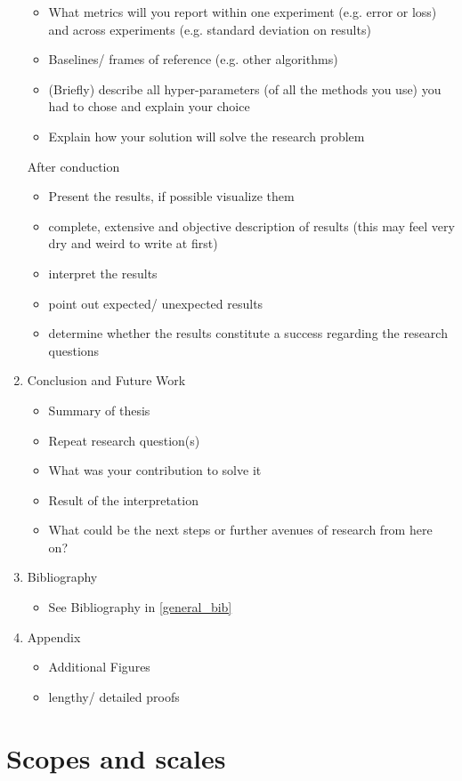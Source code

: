 \documentclass[twocolumn]{mlai-guide}
\begin{document}
\begin{enumerate}
\begin{itemize}
			\item What metrics will you report within one experiment (e.g. error or loss) and across experiments (e.g. standard deviation on results)
			\item Baselines/ frames of reference (e.g. other algorithms)
			\item (Briefly) describe all hyper-parameters (of all the methods you use) you had to chose and explain your choice
			\item Explain how your solution will solve the research problem
		\end{itemize} 
		After conduction
		\begin{itemize}
			\item Present the results, if possible visualize them
			\item complete, extensive and objective description of results (this may feel very dry and weird to write at first)
			\item interpret the results
			\item point out expected/ unexpected results
			\item determine whether the results constitute a success regarding the research questions
		\end{itemize}
	\item Conclusion and Future Work
		\begin{itemize}
			\item Summary of thesis
			\item Repeat research question(s)
			\item What was your contribution to solve it
			\item Result of the interpretation
			\item What could be the next steps or further avenues of research from here on?
		\end{itemize}
	\item Bibliography
		\begin{itemize}
			\item See Bibliography in \ref{general_bib}
		\end{itemize}
	\item Appendix
		\begin{itemize}
			\item Additional Figures
			\item lengthy/ detailed proofs
		\end{itemize}
\end{enumerate}

\section{Scopes and scales}
\end{document}
